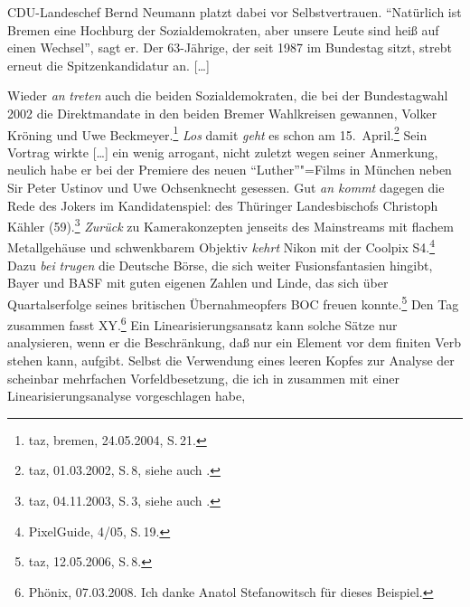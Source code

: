 CDU-Landeschef Bernd Neumann platzt dabei vor Selbstvertrauen. "`Natürlich ist Bremen eine Hochburg der Sozialdemokraten, aber unsere Leute sind heiß auf einen Wechsel"', sagt er. Der 63-Jährige, der seit 1987 im Bundestag sitzt, strebt erneut die Spitzenkandidatur an. [\ldots]

Wieder \emph{an} \emph{treten} auch die beiden Sozialdemokraten, die bei der Bundestagwahl 2002 die Direktmandate in den beiden Bremer Wahlkreisen gewannen, Volker Kröning und Uwe Beckmeyer.\footnote{
  taz, bremen, 24.05.2004, S.\,21.
}
\ex\label{bsp-los-damit}
\emph{Los} damit \emph{geht} es schon am 15.\ April.\footnote{
        taz, 01.03.2002, S.\,8, siehe auch .
    }
\ex Sein Vortrag wirkte [\ldots] %
ein wenig arrogant, nicht zuletzt wegen seiner Anmerkung,
neulich habe er bei der Premiere des neuen "`Luther"'"=Films in München neben
Sir Peter Ustinov und Uwe Ochsenknecht gesessen. %
Gut \emph{an kommt} dagegen die Rede des Jokers im Kandidatenspiel: des Thüringer Landesbischofs Christoph Kähler (59).\footnote{
        taz, 04.11.2003, S.\,3, siehe auch .%
}
\ex
\emph{Zurück} zu Kamerakonzepten jenseits des Mainstreams mit flachem Metallgehäuse und schwenkbarem Objektiv \emph{kehrt} Nikon mit der
Coolpix S4.\footnote{
  PixelGuide, 4/05, S.\,19.
}
\ex Dazu \emph{bei} \emph{trugen} die Deutsche Börse, die sich weiter Fusionsfantasien hingibt, Bayer und BASF
mit guten eigenen Zahlen und Linde, das sich über Quartalserfolge seines britischen Übernahmeopfers
BOC freuen konnte.\footnote{
  taz, 12.05.2006, S.\,8. 
}
\ex Den Tag zusammen fasst XY.\footnote{
     Phönix, 07.03.2008. Ich danke Anatol Stefanowitsch für dieses
     Beispiel.
}
\zl
Ein Linearisierungsansatz kann solche Sätze nur analysieren, 
wenn er die Beschränkung, daß nur ein Element vor dem finiten Verb stehen kann, aufgibt.
Selbst die Verwendung eines leeren Kopfes zur Analyse der scheinbar mehrfachen Vorfeldbesetzung,
die ich in  zusammen mit einer Linearisierungsanalyse vorgeschlagen habe,
